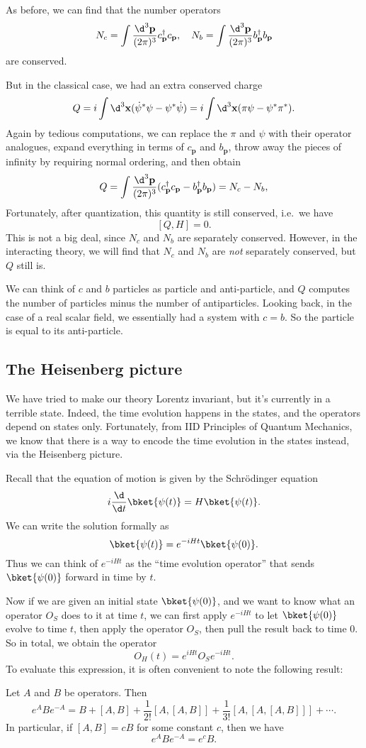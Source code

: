 \documentclass[a4paper]{article}
\begin{document}
As before, we can find that the number operators
\[
  N_c = \int \frac{\d^3 \mathbf{p}}{(2\pi)^3}c_\mathbf{p}^\dagger c_\mathbf{p},\quad N_b = \int \frac{\d^3 \mathbf{p}}{(2\pi)^3}b_\mathbf{p}^\dagger b_\mathbf{p}
\]
are conserved.

But in the classical case, we had an extra conserved charge
\[
  Q = i \int \d^3 \mathbf{x} (\dot{\psi}^* \psi - \psi^* \dot{\psi}) = i \int \d^3 \mathbf{x} (\pi \psi - \psi^* \pi^*).
\]
Again by tedious computations, we can replace the $\pi$ and $\psi$ with their operator analogues, expand everything in terms of $c_\mathbf{p}$ and $b_\mathbf{p}$, throw away the pieces of infinity by requiring normal ordering, and then obtain
\[
  Q = \int \frac{\d^3 \mathbf{p}}{(2\pi)^3} (c_\mathbf{p}^\dagger c_\mathbf{p} - b_\mathbf{p}^\dagger b_\mathbf{p}) = N_c - N_b,
\]
Fortunately, after quantization, this quantity is still conserved, i.e.\ we have
\[
  [Q, H] = 0.
\]
This is not a big deal, since $N_c$ and $N_b$ are separately conserved. However, in the interacting theory, we will find that $N_c$ and $N_b$ are \emph{not} separately conserved, but $Q$ still is.

We can think of $c$ and $b$ particles as particle and anti-particle, and $Q$ computes the number of particles minus the number of antiparticles. Looking back, in the case of a real scalar field, we essentially had a system with $c = b$. So the particle is equal to its anti-particle.

\subsection{The Heisenberg picture}
We have tried to make our theory Lorentz invariant, but it's currently in a terrible state. Indeed, the time evolution happens in the states, and the operators depend on states only. Fortunately, from IID Principles of Quantum Mechanics, we know that there is a way to encode the time evolution in the states instead, via the Heisenberg picture.

Recall that the equation of motion is given by the Schr\"odinger equation
\[
  i \frac{\d}{\d t}\bket{\psi(t)} = H \bket{\psi(t)}.
\]
We can write the solution formally as
\[
  \bket{\psi(t)} = e^{-iHt} \bket{\psi(0)}.
\]
Thus we can think of $e^{-iHt}$ as the ``time evolution operator'' that sends $\bket{\psi(0)}$ forward in time by $t$.

Now if we are given an initial state $\bket{\psi(0)}$, and we want to know what an operator $O_S$ does to it at time $t$, we can first apply $e^{-iHt}$ to let $\bket{\psi(0)}$ evolve to time $t$, then apply the operator $O_S$, then pull the result back to time $0$. So in total, we obtain the operator
\[
  O_H(t) = e^{iHt} O_S e^{-iHt}.
\]
To evaluate this expression, it is often convenient to note the following result:
\begin{prop}
  Let $A$ and $B$ be operators. Then
  \[
    e^A B e^{-A} = B + [A, B] + \frac{1}{2!}[A, [A, B]] + \frac{1}{3!}[A, [A, [A, B]]] + \cdots.
  \]
  In particular, if $[A, B] = c B$ for some constant $c$, then we have
  \[
    e^A B e^{-A} = e^c B.
  \]
\end{prop}
\end{document}
